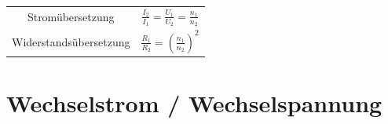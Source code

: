 \documentclass{article}
\begin{document}
\begin{mdframed}
\begin{tabular}{cc}
     \begin{minipage}{0.25\textwidth}\vspace{0.35cm} Stromübersetzung \vspace{0.35cm}\end{minipage} & $\displaystyle \frac{I_2}{I_1} = \frac{U_1}{U_2} = \frac{n_1}{n_2}$ \\ 
     \begin{minipage}{0.25\textwidth}\vspace{0.35cm} Widerstandsübersetzung \vspace{0.35cm}\end{minipage} & $\displaystyle \frac{R_1}{R_2} = (\frac{n_1}{n_2})^2$ 
\end{tabular}
\end{mdframed}

\flushleft
\section{Wechselstrom / Wechselspannung}
\vspace{-0.8\baselineskip}
\end{document}
